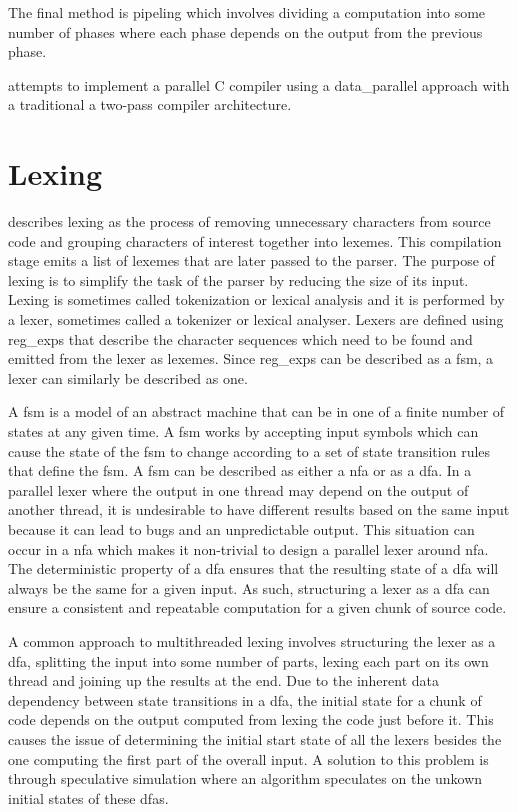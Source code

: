 The final method is pipeling which involves dividing a computation into some
number of phases where each phase depends on the output from the previous phase.

\cite{mark_thierry_vandevoorde_parallel_1988} attempts to implement a parallel
C compiler using a \gls{data_parallel} approach with a traditional a two-pass
compiler architecture.

\section{Lexing} \label{lit_review_lexing}

\cite{scott_programming_2015} describes lexing as the process of removing
unnecessary characters from source code and grouping characters of interest
together into lexemes. This compilation stage emits a list of lexemes that are
later passed to the parser. The purpose of lexing is to simplify the task
of the parser by reducing the size of its input. Lexing is sometimes  called
tokenization or lexical analysis and it is performed by a lexer, sometimes
called a tokenizer or lexical analyser. Lexers are defined using \glspl{reg_exp}
that describe the character sequences which need to be found and emitted from
the lexer as lexemes. Since \glspl{reg_exp} can be described as a \gls{fsm}, a
lexer can similarly be described as one.

A \gls{fsm} is a model of an abstract machine that can be in one of a finite
number of states at any given time. A \gls{fsm} works by accepting input symbols
which can cause the state of the \gls{fsm} to change according to a set of
state transition rules that define the \gls{fsm}. A \gls{fsm} can be described
as either a \gls{nfa} or as a \gls{dfa}. In a parallel lexer where the output
in one thread may depend on the output of another thread, it is undesirable to
have different results based on the same input because it can lead to bugs and
an unpredictable output. This situation can occur in a \gls{nfa} which makes
it non-trivial to design a parallel lexer around \gls{nfa}. The deterministic
property of a \gls{dfa} ensures that the resulting state of a
\gls{dfa} will always be the same for a given input.  As such, structuring a
lexer as a \gls{dfa} can ensure a consistent and repeatable computation for a
given chunk of source code.

A common approach to multithreaded lexing involves structuring the lexer as a
\gls{dfa}, splitting the input into some number of parts, lexing each part on
its own thread and joining up the results at the end. Due to the inherent data
dependency between state transitions in a \gls{dfa}, the initial state for a
chunk of code depends on the output computed from lexing the code just before
it. This causes the issue of determining the initial start state of all the
lexers besides the one computing the first part of the overall input. A solution
to this problem is through speculative simulation where an algorithm speculates
on the unkown initial states of these \gls{dfa}s.

